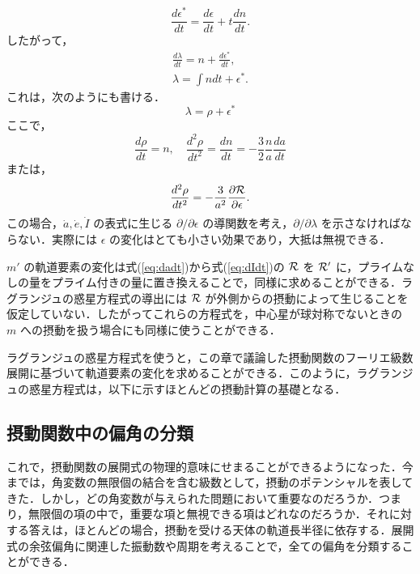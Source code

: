 \documentclass[11pt,a4paper,oneside,onecolumn]{jreport}
\begin{document}
\begin{equation}
\frac{d \epsilon^{\ast}}{d t} = \frac{d \epsilon}{d t} + t \frac{d n}{d t}.
\end{equation}
したがって，
\begin{eqnarray}
\frac{d \lambda}{d t} = n + \frac{d \epsilon^{\ast}}{d t}, \\
\lambda = \int n d t + \epsilon^{\ast}.
\end{eqnarray}
これは，次のようにも書ける．
\begin{equation}
\lambda = \rho + \epsilon^{\ast}
\end{equation}
ここで，
\begin{equation}
\frac{d \rho}{d t} = n, \quad \frac{d^2 \rho}{d t^2} = \frac{d n}{d t} = - \frac{3}{2} \frac{n}{a} \frac{d a}{d t}
\end{equation}
または，
\begin{equation}
\frac{d^2 \rho}{d t^2} = - \frac{3}{a^2} \frac{\partial {\cal R}}{\partial \epsilon}.
\end{equation}
この場合，$\dot{a}, \dot{e}, \dot{I}$ の表式に生じる $\partial / \partial \epsilon$ の導関数を考え，$\partial / \partial \lambda$ を示さなければならない．実際には $\epsilon$ の変化はとても小さい効果であり，大抵は無視できる．

$m'$ の軌道要素の変化は式(\ref{eq:dadt})から式(\ref{eq:dIdt})の ${\cal R}$ を ${\cal R'}$ に，プライムなしの量をプライム付きの量に置き換えることで，同様に求めることができる．ラグランジュの惑星方程式の導出には ${\cal R}$ が外側からの摂動によって生じることを仮定していない．したがってこれらの方程式を，中心星が球対称でないときの $m$ への摂動を扱う場合にも同様に使うことができる．

ラグランジュの惑星方程式を使うと，この章で議論した摂動関数のフーリエ級数展開に基づいて軌道要素の変化を求めることができる．このように，ラグランジュの惑星方程式は，以下に示すほとんどの摂動計算の基礎となる．

\subsection{摂動関数中の偏角の分類}
これで，摂動関数の展開式の物理的意味にせまることができるようになった．今までは，角変数の無限個の結合を含む級数として，摂動のポテンシャルを表してきた．しかし，どの角変数が与えられた問題において重要なのだろうか．つまり，無限個の項の中で，重要な項と無視できる項はどれなのだろうか．それに対する答えは，ほとんどの場合，摂動を受ける天体の軌道長半径に依存する．展開式の余弦偏角に関連した振動数や周期を考えることで，全ての偏角を分類することができる．
\end{document}

